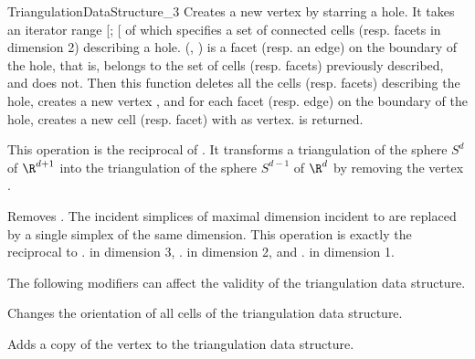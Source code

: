 \begin{ccRefConcept}{TriangulationDataStructure_3}
{Creates a new vertex by starring a hole.  It takes an iterator range
[; [ of  which specifies a set
of connected cells (resp. facets in dimension 2) describing a hole.
(, ) is a facet (resp. an edge) on the boundary of the hole,
that is,  belongs to the set of cells (resp.  facets) previously
described, and  does not.  Then this function deletes
all the cells (resp. facets) describing the hole, creates a new vertex
, and for each facet (resp. edge) on the boundary of the hole, creates
a new cell (resp. facet) with  as vertex.   is returned.
}


{This operation is the reciprocal of .
It transforms a triangulation of the sphere $S^d$ of $\R^{d+1}$ into the
triangulation of the sphere $S^{d-1}$ of $\R^{d}$ by removing the vertex
.
}

{Removes . The incident simplices of maximal dimension incident to
 are replaced by a single simplex of the same dimension. This
operation is exactly the reciprocal to \ccVar. in
dimension 3, \ccVar. in dimension 2, and
\ccVar. in dimension 1.
}


\begin{ccAdvanced}
The following modifiers can affect the validity of the triangulation
data structure.

{Changes the orientation of all cells of the triangulation data structure.
}

{Adds a copy of the vertex  to the triangulation data structure.}


\end{ccAdvanced}
\end{ccRefConcept}
